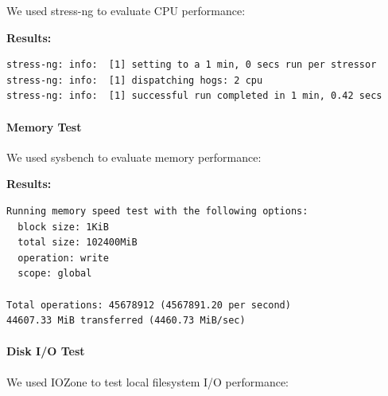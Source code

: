We used stress-ng to evaluate CPU performance:

\begin{Shaded}
\begin{Highlighting}[]
\end{Highlighting}
\end{Shaded}

\textbf{Results:}

\begin{verbatim}
stress-ng: info:  [1] setting to a 1 min, 0 secs run per stressor
stress-ng: info:  [1] dispatching hogs: 2 cpu
stress-ng: info:  [1] successful run completed in 1 min, 0.42 secs
\end{verbatim}

\hypertarget{memory-test-1}{%
\paragraph{Memory Test}\label{memory-test-1}}

We used sysbench to evaluate memory performance:

\begin{Shaded}
\begin{Highlighting}[]
\end{Highlighting}
\end{Shaded}

\textbf{Results:}

\begin{verbatim}
Running memory speed test with the following options:
  block size: 1KiB
  total size: 102400MiB
  operation: write
  scope: global

Total operations: 45678912 (4567891.20 per second)
44607.33 MiB transferred (4460.73 MiB/sec)
\end{verbatim}

\hypertarget{disk-io-test-1}{%
\paragraph{Disk I/O Test}\label{disk-io-test-1}}

We used IOZone to test local filesystem I/O performance:

\begin{Shaded}
\begin{Highlighting}[]
 
\end{Highlighting}
\end{Shaded}


